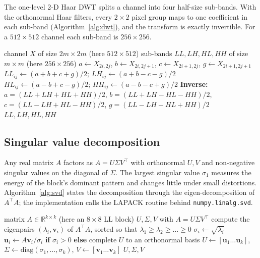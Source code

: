 \documentclass[11pt,a4paper]{article}
\begin{document}
The one-level 2-D Haar DWT splits a channel into four half-size sub-bands. With the orthonormal Haar filters, every $2\times2$ pixel group maps to one coefficient in each sub-band (Algorithm~\ref{alg:dwt}), and the transform is exactly invertible. For a $512\times512$ channel each sub-band is $256\times256$. %

\begin{algorithm}[!htbp]
\caption{One-level 2-D Haar DWT and its inverse}\label{alg:dwt}
\begin{algorithmic}[1]
\Require channel $X$ of size $2m\times2m$ (here $512\times512$)
\Ensure sub-bands $LL, LH, HL, HH$ of size $m\times m$ (here $256\times256$)
  \State $a\gets X_{2i,2j}$, $b\gets X_{2i,2j+1}$, $c\gets X_{2i+1,2j}$, $g\gets X_{2i+1,2j+1}$
  \State $LL_{ij}\gets (a+b+c+g)/2$; \quad $LH_{ij}\gets (a+b-c-g)/2$
  \State $HL_{ij}\gets (a-b+c-g)/2$; \quad $HH_{ij}\gets (a-b-c+g)/2$
\EndFor
\State \textbf{Inverse:} $a=(LL+LH+HL+HH)/2$, $b=(LL+LH-HL-HH)/2$, $c=(LL-LH+HL-HH)/2$, $g=(LL-LH-HL+HH)/2$
\State \Return $LL, LH, HL, HH$ 
\end{algorithmic}
\end{algorithm}

\subsection{Singular value decomposition}

Any real matrix $A$ factors as $A=U\Sigma V^{\top}$ with orthonormal $U,V$ and non-negative singular values on the diagonal of $\Sigma$. The largest singular value $\sigma_1$ measures the energy of the block's dominant pattern and changes little under small distortions. Algorithm~\ref{alg:svd} states the decomposition through the eigen-decomposition of $A^{\top}A$; the implementation calls the LAPACK routine behind \texttt{numpy.linalg.svd}.

\begin{algorithm}[!htbp]
\caption{Singular value decomposition (conceptual)}\label{alg:svd}
\begin{algorithmic}[1]
\Require matrix $A\in\mathbb{R}^{k\times k}$ (here an $8\times8$ LL block)
\Ensure $U, \Sigma, V$ with $A=U\Sigma V^{\top}$
\State compute the eigenpairs $(\lambda_i, \mathbf{v}_i)$ of $A^{\top}A$, sorted so that $\lambda_1\ge\lambda_2\ge\dots\ge0$
  \State $\sigma_i\gets\sqrt{\lambda_i}$
  \State $\mathbf{u}_i\gets A\mathbf{v}_i/\sigma_i$ \textbf{if} $\sigma_i>0$ \textbf{else} complete $U$ to an orthonormal basis
\EndFor
\State $U\gets[\mathbf{u}_1\dots\mathbf{u}_k]$, $\Sigma\gets\mathrm{diag}(\sigma_1,\dots,\sigma_k)$, $V\gets[\mathbf{v}_1\dots\mathbf{v}_k]$
\State \Return $U,\Sigma,V$
\end{algorithmic}
\end{algorithm}
\end{document}
